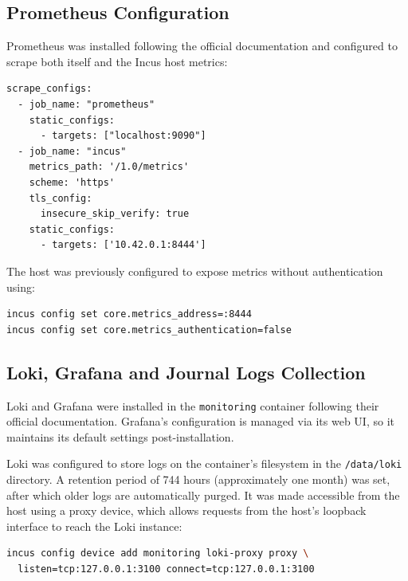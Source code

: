 \subsection*{Prometheus Configuration}

Prometheus was installed following the official documentation\cite{prometheus-getting-started} and configured to scrape both itself and the Incus host metrics:

\begin{lstlisting}[caption={Prometheus configuration to scrape metrics from itself and the Incus host.}]
scrape_configs:
  - job_name: "prometheus"
    static_configs:
      - targets: ["localhost:9090"]
  - job_name: "incus"
    metrics_path: '/1.0/metrics'
    scheme: 'https'
    tls_config:
      insecure_skip_verify: true
    static_configs:
      - targets: ['10.42.0.1:8444']
\end{lstlisting}

The host was previously configured to expose metrics without authentication using:

\begin{lstlisting}[language=bash]
incus config set core.metrics_address=:8444
incus config set core.metrics_authentication=false
\end{lstlisting}

\subsection*{Loki, Grafana and Journal Logs Collection}

Loki and Grafana were installed in the \texttt{monitoring} container following their official documentation\cite{grafana-install-debian,loki-storage-retention}. Grafana's configuration is managed via its web UI, so it maintains its default settings post-installation.

Loki was configured to store logs on the container's filesystem in the \texttt{/data/loki} directory. A retention period of 744 hours (approximately one month) was set, after which older logs are automatically purged. It was made accessible from the host using a proxy device, which allows requests from the host's loopback interface to reach the Loki instance:

\begin{lstlisting}[language=bash]
incus config device add monitoring loki-proxy proxy \
  listen=tcp:127.0.0.1:3100 connect=tcp:127.0.0.1:3100
\end{lstlisting}

